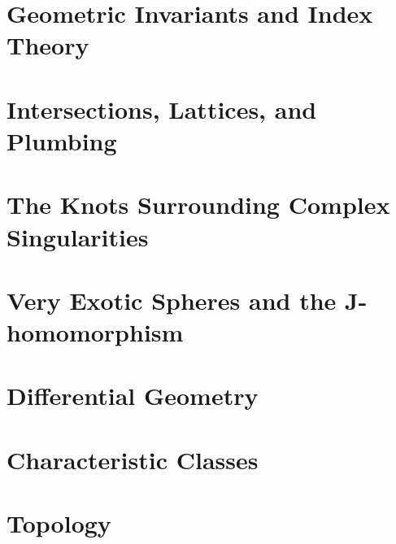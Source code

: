 \documentclass{lkx_thesis}
\begin{document}
\chapter{Geometric Invariants and Index Theory}\label{chap:detection}


\chapter{Intersections, Lattices, and Plumbing}\label{chap:construction_a}


\chapter{The Knots Surrounding Complex Singularities}\label{chap:construction_b}


\chapter{Very Exotic Spheres and the \texorpdfstring{$\bm{J}$}{J}-homomorphism}\label{chap:classification}


\begin{appendices}
	\chapter{Differential Geometry}\label{chap:differential_geometry}
	

	\chapter{Characteristic Classes}\label{chap:characteristic_classes}
	

	\chapter{Topology}\label{chap:topology}
	
\end{appendices}

\lkxrefs
\lkxindex
\end{document}
